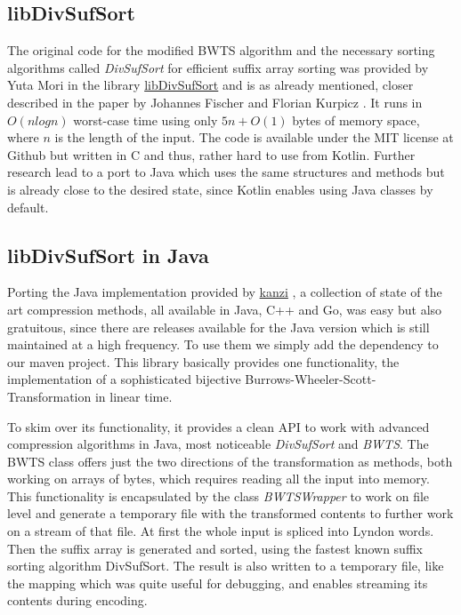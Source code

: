 \subsection{libDivSufSort}
\label{ch:Implementation:sec:Impl:subsec:libs:libDivSufSot}
\par{
The original code for the modified BWTS algorithm and the necessary sorting algorithms called \emph{DivSufSort} for efficient suffix array sorting was provided by Yuta Mori in the library \href{https://github.com/y-256/libdivsufsort}{libDivSufSort} \cite{LibDivSufSort} and is as already mentioned, closer described in the paper by Johannes Fischer and Florian Kurpicz \cite{DBLP:journals/corr/abs-1710-01896}. It  runs in $O(n log n)$ worst-case time using only $5n+O(1)$ bytes of memory space, where $n$ is the length of the input. The code is available under the MIT license at Github but written in C and thus, rather hard to use from Kotlin. Further research lead to a port to Java which uses the same structures and methods but is already close to the desired state, since Kotlin enables using Java classes by default.
}
\subsection{libDivSufSort in Java}
\label{ch:Implementation:sec:Impl:subsec:libs:libDivSufSort Java}
\par{
Porting the Java implementation provided by \href{https://github.com/flanglet/kanzi/releases}{kanzi} \cite{kanzi}, a collection of state of the art compression methods, all available in Java, C++ and Go, was easy but also gratuitous, since there are releases available for the Java version which is still maintained at a high frequency. To use them we simply add the dependency to our maven project. This library basically provides one functionality, the implementation of a sophisticated bijective Burrows-Wheeler-Scott-Transformation in linear time.
}
\par{
To skim over its functionality, it provides a clean API to work with advanced compression algorithms in Java, most noticeable \emph{DivSufSort} and \emph{BWTS}. The BWTS class offers just the two directions of the transformation as methods, both working on arrays of bytes, which requires reading all the input into memory. This functionality is encapsulated by the class \emph{BWTSWrapper} to work on file level and generate a temporary file with the transformed contents to further work on a stream of that file. At first the whole input is spliced into Lyndon words. Then the suffix array is generated and sorted, using the fastest known suffix sorting algorithm DivSufSort. The result is also written to a temporary file, like the mapping which was quite useful for debugging, and enables streaming its contents during encoding. 
}

